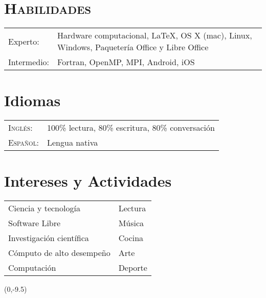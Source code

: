 \documentclass[letterpaper,10pt]{article}
\begin{document}
\section{\textsc{Habilidades}}
	\begin{tabular}{R{4cm} p{10cm}}
		Experto:	&	Hardware computacional, \LaTeX, OS X (mac), Linux, Windows, Paquetería Office y Libre Office\\ 
		Intermedio:	&	Fortran, OpenMP, MPI, Android, iOS\\
	\end{tabular}

\section{Idiomas}
	\begin{tabular}{R{4cm}l}
		\textsc{Ingl\'es}:	&	100\% lectura, 80\% escritura, 80\% conversación \\
		\textsc{Espa\~nol}:	&	Lengua nativa \\
	\end{tabular}

\section{Intereses y Actividades}
	\begin{tabular}{l|l}
		Ciencia y tecnolog\'ia 			&	Lectura\\
		Software Libre					&	M\'usica\\
		Investigaci\'on cient\'ifica	&	Cocina  \\
		C\'omputo de alto desempe\~no	&	Arte\\
		Computaci\'on					&	Deporte\\													
	\end{tabular}

\begin{textblock}{1}(0,-9.5)
\end{textblock}
\end{document}

